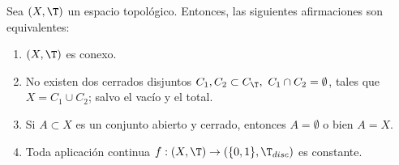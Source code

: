 \begin{prop}
    Sea $(X,\T)$ un espacio topológico. Entonces, las siguientes afirmaciones son equivalentes:
    \begin{enumerate}
        \item $(X,\T)$ es conexo.
        \item No existen dos cerrados disjuntos $C_1,C_2\subset C_{\T},~C_1\cap C_2=\emptyset$, tales que $X=C_1\cup C_2$; salvo el vacío y el total.
        \item Si $A\subset X$ es un conjunto abierto y cerrado, entonces $A=\emptyset$ o bien $A=X$.
        \item Toda aplicación continua $f:(X,\T)\to \left(\{0,1\},\T_{disc}\right)$ es constante.
    \end{enumerate}
\end{prop}
